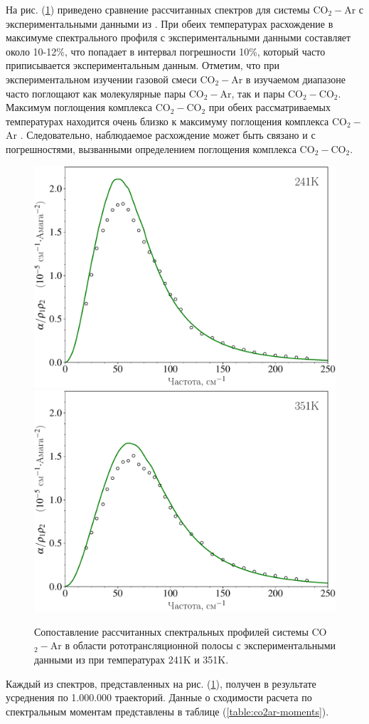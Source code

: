 На рис. (\ref{fig:co2ar-spectra}) приведено сравнение рассчитанных спектров для системы CO$_2-$Ar с экспериментальными данными из \cite{tonkov1995}. При обеих температурах расхождение в максимуме спектрального профиля с экспериментальными данными составляет около 10-12\%, что попадает в интервал погрешности 10\%, который часто приписывается экспериментальным данным.
Отметим, что при экспериментальном изучении газовой смеси CO$_2-$Ar в изучаемом диапазоне часто поглощают как молекулярные пары CO$_2-$Ar, так и пары CO$_2-$CO$_2$. Максимум поглощения комплекса CO$_2-$CO$_2$ при обеих рассматриваемых температурах находится очень близко к максимуму поглощения комплекса CO$_2-$Ar \cite{gruszka1997}. Следовательно, наблюдаемое расхождение может быть связано и с погрешностями, вызванными определением поглощения комплекса CO$_2-$CO$_2$.

\begin{figure}[H]
    \centering
    \includegraphics[width=0.49\linewidth]{./pictures/polyatom_spectra/co2_ar/241K_russian-crop.pdf}
    \includegraphics[width=0.49\linewidth]{./pictures/polyatom_spectra/co2_ar/351K_russian-crop.pdf}
    \caption{Сопоставление рассчитанных спектральных профилей системы CO$_2-$Ar в области рототрансляционной полосы с экспериментальными данными из \cite{tonkov1995} при температурах 241K и 351K.}
    \label{fig:co2ar-spectra}
\end{figure}

Каждый из спектров, представленных на рис. (\ref{fig:co2ar-spectra}), получен в результате усреднения по 1.000.000 траекторий. Данные о сходимости расчета по спектральным моментам представлены в таблице (\ref{table:co2ar-moments}). 

